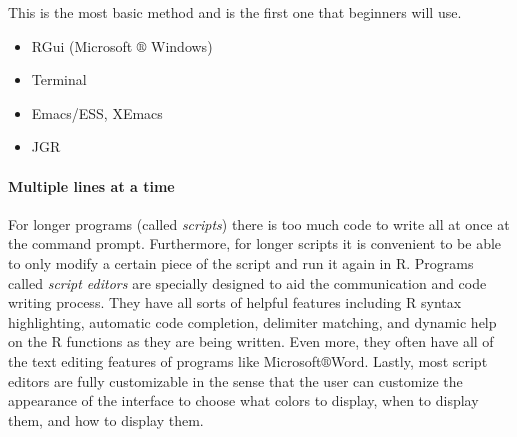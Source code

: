 \documentclass[captions=tableheading]{scrbook}
\begin{document}
This is the most basic method and is the first one that beginners will use.
\begin{itemize}
\item RGui (Microsoft \(\circledR\) Windows)
\item Terminal
\item Emacs/ESS, XEmacs
\item JGR
\end{itemize}

\paragraph*{Multiple lines at a time}

For longer programs (called \emph{scripts}) there is too much code to write all at once at the command prompt. Furthermore, for longer scripts it is convenient to be able to only modify a certain piece of the script and run it again in \textsf{R}. Programs called \emph{script editors} are specially designed to aid the communication and code writing process. They have all sorts of helpful features including \textsf{R} syntax highlighting, automatic code completion, delimiter matching, and dynamic help on the \textsf{R} functions as they are being written. Even more, they often have all of the text editing features of programs like Microsoft\(\circledR\)Word. Lastly, most script editors are fully customizable in the sense that the user can customize the appearance of the interface to choose what colors to display, when to display them, and how to display them.
\end{document}
